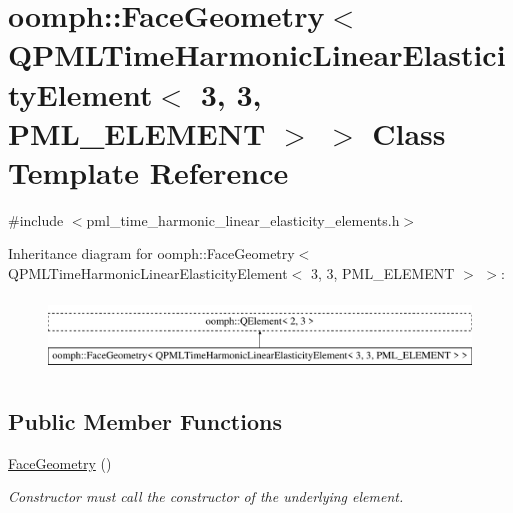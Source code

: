 \hypertarget{classoomph_1_1FaceGeometry_3_01QPMLTimeHarmonicLinearElasticityElement_3_013_00_013_00_01PML__ELEMENT_01_4_01_4}{}\section{oomph\+:\+:Face\+Geometry$<$ Q\+P\+M\+L\+Time\+Harmonic\+Linear\+Elasticity\+Element$<$ 3, 3, P\+M\+L\+\_\+\+E\+L\+E\+M\+E\+NT $>$ $>$ Class Template Reference}
\label{classoomph_1_1FaceGeometry_3_01QPMLTimeHarmonicLinearElasticityElement_3_013_00_013_00_01PML__ELEMENT_01_4_01_4}


{\ttfamily \#include $<$pml\+\_\+time\+\_\+harmonic\+\_\+linear\+\_\+elasticity\+\_\+elements.\+h$>$}

Inheritance diagram for oomph\+:\+:Face\+Geometry$<$ Q\+P\+M\+L\+Time\+Harmonic\+Linear\+Elasticity\+Element$<$ 3, 3, P\+M\+L\+\_\+\+E\+L\+E\+M\+E\+NT $>$ $>$\+:\begin{figure}[H]
\begin{center}
\leavevmode
\includegraphics[height=1.989343cm]{classoomph_1_1FaceGeometry_3_01QPMLTimeHarmonicLinearElasticityElement_3_013_00_013_00_01PML__ELEMENT_01_4_01_4}
\end{center}
\end{figure}
\subsection*{Public Member Functions}
\begin{DoxyCompactItemize}
\item 
\hyperlink{classoomph_1_1FaceGeometry_3_01QPMLTimeHarmonicLinearElasticityElement_3_013_00_013_00_01PML__ELEMENT_01_4_01_4_ab6d487acad6cd03405a7068a1614efa1}{Face\+Geometry} ()
\begin{DoxyCompactList}\small\item\em Constructor must call the constructor of the underlying element. \end{DoxyCompactList}\end{DoxyCompactItemize}


